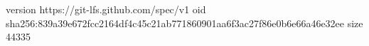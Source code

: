 version https://git-lfs.github.com/spec/v1
oid sha256:839a39e672fcc2164df4c45c21ab771860901aa6f3ac27f86e0b6e66a46e32ee
size 44335
